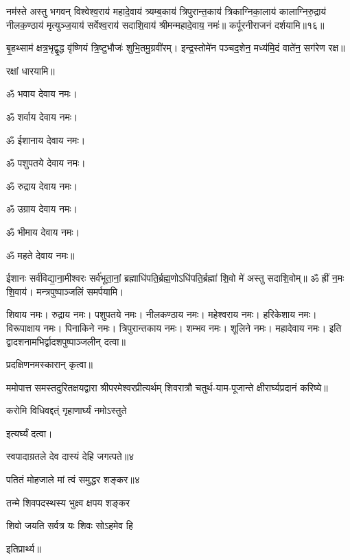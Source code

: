 नम॑स्ते अस्तु भगवन् विश्वेश्व॒राय॑ महादे॒वाय॑ त्र्यम्ब॒काय॑ त्रिपुरान्त॒काय॑ त्रिकाग्निका॒लाय॑ कालाग्निरु॒द्राय॑ नीलक॒ण्ठाय॑ मृत्युञ्ज॒याय॑ सर्वेश्व॒राय॑ सदाशि॒वाय॑ श्रीमन्महादे॒वाय॒ नमः॑॥ कर्पूरनीराजनं दर्शयामि॥१६॥

बृ॒हथ्साम॑ क्षत्र॒भृद्वृ॒द्ध वृ॑ष्णियं त्रि॒ष्टुभौजः॑ शुभि॒तमु॒ग्रवी॑रम्।
इन्द्र॒स्तोमे॑न पञ्चद॒शेन॒ मध्य॑मि॒दं वाते॑न॒ सग॑रेण रक्ष॥

रक्षां धारयामि॥

ॐ भवाय देवाय नमः। 

ॐ शर्वाय देवाय नमः। 

ॐ ईशानाय देवाय नमः। 

ॐ पशुपतये देवाय नमः। 

ॐ रुद्राय देवाय नमः। 

ॐ उग्राय देवाय नमः। 

ॐ भीमाय देवाय नमः। 

ॐ महते देवाय नमः॥


ईशानः सर्व॑विद्या॒ना॒मीश्वरः सर्व॑भूता॒नां॒ ब्रह्माधि॑पति॒र्ब्रह्म॒णो\-ऽधि॑पति॒र्ब्रह्मा॑ शि॒वो मे॑ अस्तु सदाशि॒वोम्॥ ॐ ह्रीं न॒मः शि॒वाय॑। मन्त्रपुष्पाञ्जलिं समर्पयामि।   


शिवाय नमः। रुद्राय नमः। पशुपतये नमः। नीलकण्ठाय नमः। महेश्वराय नमः। हरिकेशाय नमः। विरूपाक्षाय नमः। पिनाकिने नमः। त्रिपुरान्तकाय नमः। शम्भव नमः। शूलिने नमः। महादेवाय नमः। इति द्वादशनामभिर्द्वादशपुष्पाञ्जलीन् दत्वा॥

प्रदक्षिणनमस्कारान् कृत्वा॥



ममोपात्त समस्तदुरितक्षयद्वारा श्रीपरमेश्वरप्रीत्यर्थम् शिवरात्रौ चतुर्थ-याम-पूजान्ते क्षीरार्घ्यप्रदानं करिष्ये॥

{करोमि विधिवद्दत्ं गृहाणार्घ्यं नमोऽस्तुते}

इत्यर्घ्यं दत्वा।
\medskip


{स्वपादाग्रतले देव दास्यं देहि जगत्पते॥४}



{पतितं मोहजाले मां त्वं समुद्धर शङ्कर॥४}

{तन्मे शिवपदस्थस्य भुक्ष्व क्षपय शङ्कर}

{शिवो जयति सर्वत्र यः शिवः सोऽहमेव हि}

इतिप्रार्थ्य॥

